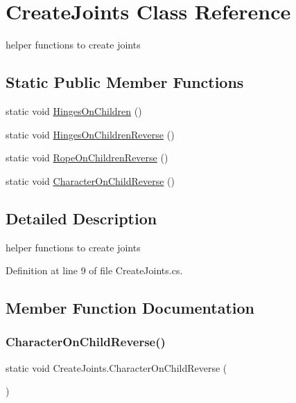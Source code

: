 \hypertarget{class_create_joints}{}\section{Create\+Joints Class Reference}
\label{class_create_joints}


helper functions to create joints  


\subsection*{Static Public Member Functions}
\begin{DoxyCompactItemize}
\item 
static void \mbox{\hyperlink{class_create_joints_ab66cd27a24594e2a647456a799e43168}{Hinges\+On\+Children}} ()
\item 
static void \mbox{\hyperlink{class_create_joints_a62f6e599596a76ffc0143445f0f42776}{Hinges\+On\+Children\+Reverse}} ()
\item 
static void \mbox{\hyperlink{class_create_joints_a28fad472b33b9fcad21a4791e43d3892}{Rope\+On\+Children\+Reverse}} ()
\item 
static void \mbox{\hyperlink{class_create_joints_a723e065af754a361f364a2b9be3fe819}{Character\+On\+Child\+Reverse}} ()
\end{DoxyCompactItemize}


\subsection{Detailed Description}
helper functions to create joints 



Definition at line 9 of file Create\+Joints.\+cs.



\subsection{Member Function Documentation}
\mbox{\label{class_create_joints_a723e065af754a361f364a2b9be3fe819}} 
\subsubsection{\texorpdfstring{Character\+On\+Child\+Reverse()}{CharacterOnChildReverse()}}
{\footnotesize\ttfamily static void Create\+Joints.\+Character\+On\+Child\+Reverse (\begin{DoxyParamCaption}{ }\end{DoxyParamCaption})\hspace{0.3cm}{\ttfamily [static]}}



